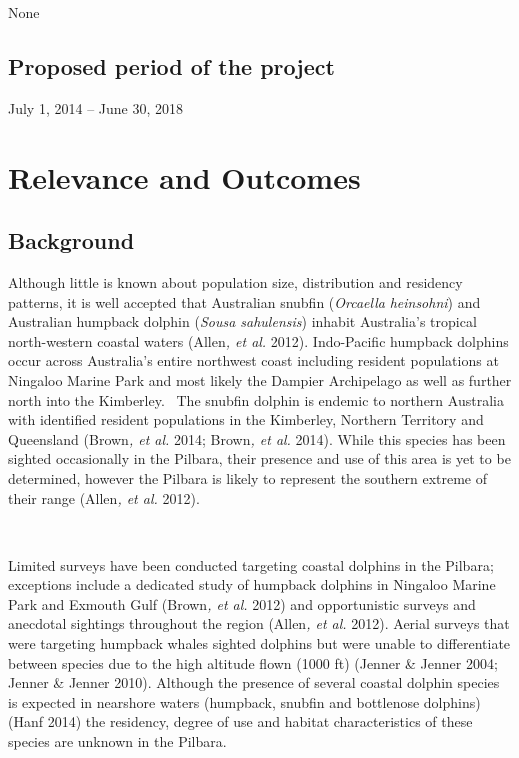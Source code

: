 \documentclass[version=last,
    paper=a4,                               %
    10pt,                                   %
    dvipsnames,
    oneside,                              %
    headings=openany,                       %
    open=any,
    BCOR=7mm,                               %
    DIV=15,     %
]{scrbook}
\begin{document}
None


\subsection*{Proposed period of the project}
July 1, 2014 -- June 30, 2018



\section*{Relevance and Outcomes}


\subsection*{Background}

Although little is known about population size, distribution and
residency patterns, it is well accepted that Australian snubfin
(\emph{Orcaella} \emph{heinsohni}) and Australian humpback dolphin
(\emph{Sousa sahulensis}) inhabit Australia's tropical north-western
coastal waters (Allen\emph{, et al.} 2012). Indo-Pacific humpback
dolphins occur across Australia's entire northwest coast including
resident populations at Ningaloo Marine Park and most likely the Dampier
Archipelago as well as further north into the Kimberley.~ The snubfin
dolphin is endemic to northern Australia with identified resident
populations in the Kimberley, Northern Territory and Queensland
(Brown\emph{, et al.} 2014; Brown\emph{, et al.} 2014). While this
species has been sighted occasionally in the Pilbara, their presence and
use of this area is yet to be determined, however the Pilbara is likely
to represent the southern extreme of their range (Allen\emph{, et al.}
2012).

~

Limited surveys have been conducted targeting coastal dolphins in the
Pilbara; exceptions include a dedicated study of humpback dolphins in
Ningaloo Marine Park and Exmouth Gulf (Brown\emph{, et al.} 2012) and
opportunistic surveys and anecdotal sightings throughout the region
(Allen\emph{, et al.} 2012). Aerial surveys that were targeting humpback
whales sighted dolphins but were unable to differentiate between species
due to the high altitude flown (1000 ft) (Jenner \& Jenner 2004; Jenner
\& Jenner 2010). Although the presence of several coastal dolphin
species is expected in nearshore waters (humpback, snubfin and
bottlenose dolphins) (Hanf 2014) the residency, degree of use and
habitat characteristics of these species are unknown in the Pilbara.
\end{document}
